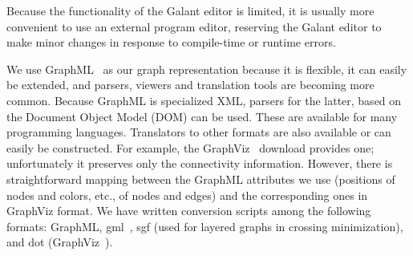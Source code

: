 Because the functionality of the Galant editor is limited, it is usually more
convenient to use an external program editor, reserving the Galant editor to
make minor changes in response to compile-time or runtime errors.

We use GraphML~\cite{GraphML} as our graph representation because it is
flexible, it can easily be extended, and parsers, viewers and translation
tools are becoming more common.  Because GraphML is specialized XML, parsers
for the latter, based on the Document Object Model (DOM) can be used. These
are available for many programming languages.  Translators to other formats
are also available or can easily be constructed.  For example, the
GraphViz~\cite{GraphViz} download provides one; unfortunately it preserves
only the connectivity information.  However, there is straightforward mapping
between the GraphML attributes we use (positions of nodes and colors, etc.,
of nodes and edges) and the corresponding ones in GraphViz format.  We have
written conversion scripts among the following formats: GraphML,
gml~\cite{1999-TRPassau-Himsolt}, sgf
(used for layered graphs in crossing minimization), and dot (GraphViz~\cite{GraphViz}).

